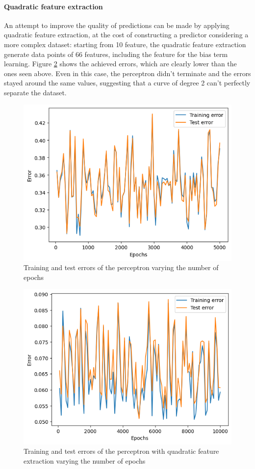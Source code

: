 \documentclass{article}
\begin{document}
\paragraph{Quadratic feature extraction}
An attempt to improve the quality of predictions can be made by applying quadratic feature extraction, at the cost of constructing a predictor considering a more complex dataset: starting from 10 feature, the quadratic feature extraction generate data points of 66 features, including the feature for the bias term learning. 
Figure \ref{fig:quad_perceptron} shows the achieved errors, which are clearly lower than the ones seen above. Even in this case, the perceptron didn't terminate and the errors stayed around the same values, suggesting that a curve of degree 2 can't perfectly separate the dataset.

\begin{figure}
	\centering
	\includegraphics[width=0.6\columnwidth]{../plots/perceptron.png}
	\caption{Training and test errors of the perceptron varying the number of epochs}
	\label{fig:perceptron}
\end{figure}
\begin{figure}
	\centering
	\includegraphics[width=0.6\columnwidth]{../plots/quad_perceptron.png}
	\caption{Training and test errors of the perceptron with quadratic feature extraction varying the number of epochs}
	\label{fig:quad_perceptron}
\end{figure}
\end{document}
